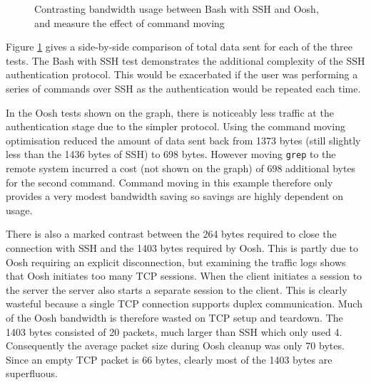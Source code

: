\documentclass[12pt,twoside,notitlepage]{report}
\begin{document}
\begin{figure}[h]
  \centering
  \setlength\fboxsep{0.5pt}
  \setlength\fboxrule{0.5pt}
  \caption{Contrasting bandwidth usage between Bash with SSH and Oosh,
  and measure the effect of command moving}
\label{networkgraph}
\end{figure}

Figure \ref{networkgraph} gives a side-by-side comparison of total
data sent for each of the three tests. The Bash with SSH test
demonstrates the additional complexity of the SSH authentication
protocol. This would be exacerbated if the user was performing a
series of commands over SSH as the authentication would be repeated
each time.

In the Oosh tests shown on the graph, there is noticeably less traffic
at the authentication stage due to the simpler protocol. Using the
command moving optimisation reduced the amount of data sent back from
1373 bytes (still slightly less than the 1436 bytes of SSH) to 698
bytes. However moving {\tt grep} to the remote system incurred a cost
(not shown on the graph) of 698 additional bytes for the second
command. Command moving in this example therefore only provides a very
modest bandwidth saving so savings are highly dependent on usage.

There is also a marked contrast between the 264 bytes required to
close the connection with SSH and the 1403 bytes required by
Oosh. This is partly due to Oosh requiring an explicit disconnection,
but examining the traffic logs shows that Oosh initiates too many TCP
sessions. When the client initiates a session to the server the server
also starts a separate session to the client. This is clearly wasteful
because a single TCP connection supports duplex communication. Much of
the Oosh bandwidth is therefore wasted on TCP setup and teardown. The
1403 bytes consisted of 20 packets, much larger than SSH which only
used 4. Consequently the average packet size during Oosh cleanup was
only 70 bytes. Since an empty TCP packet is 66 bytes, clearly most of
the 1403 bytes are superfluous.
\end{document}
